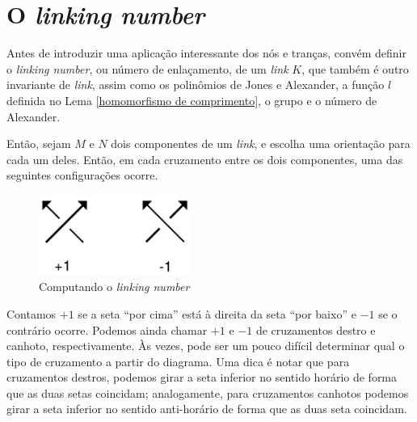 \section{O \textit{linking number}}
	Antes de introduzir uma aplicação interessante dos nós e tranças, convém definir o \textit{linking number}, 
	ou número de enlaçamento, de um \textit{link} $K$, que também é outro invariante de \textit{link}, assim 
	como os polinômios de Jones e Alexander, a função $l$ definida no Lema \ref{homomorfismo de comprimento}, 
	o grupo e o número de Alexander.  
	
	\par\vspace{0.3cm} Então, sejam $M$ e $N$ dois componentes de um \textit{link}, e escolha uma orientação 
	para cada um deles. Então, em cada cruzamento entre os dois componentes, uma das seguintes 
	configurações ocorre.
	\begin{figure}[H]
		\begin{center}
			\includegraphics[width=5cm]{Images/linking_number.png}
		\end{center}\caption{Computando o \textit{linking number}}\label{linking number}
	\end{figure}
	Contamos $+1$ se a seta ``por cima'' está à direita da seta ``por baixo'' e 
	$-1$ se o contrário ocorre. Podemos ainda chamar $+1$ e $-1$ de cruzamentos destro e canhoto, respectivamente.
	Às vezes, pode ser um pouco difícil determinar qual o tipo de cruzamento a partir do diagrama. Uma dica é 
	notar que para cruzamentos destros, podemos girar a seta inferior no sentido horário de forma que as duas 
	setas coincidam; analogamente, para cruzamentos canhotos podemos girar a seta inferior no sentido 
	anti-horário de forma que as duas seta coincidam.
	
